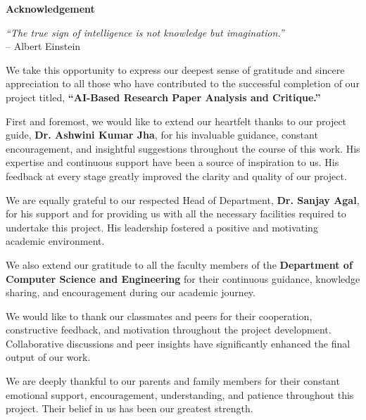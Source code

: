 \thispagestyle{empty}
\newpage
\cleardoublepage{}
{}
\begin{center}
{\Large \bf Acknowledgement}\\[10pt]
\end{center}

\begin{flushright}
\textit{“The true sign of intelligence is not knowledge but imagination.”}\\
\vspace{2mm}
– Albert Einstein
\end{flushright}

\vspace{10pt}

We take this opportunity to express our deepest sense of gratitude and sincere appreciation to all those who have contributed to the successful completion of our project titled, \textbf{“AI-Based Research Paper Analysis and Critique.”}

First and foremost, we would like to extend our heartfelt thanks to our project guide, \textbf{Dr. Ashwini Kumar Jha}, for his invaluable guidance, constant encouragement, and insightful suggestions throughout the course of this work. His expertise and continuous support have been a source of inspiration to us. His feedback at every stage greatly improved the clarity and quality of our project.

We are equally grateful to our respected Head of Department, \textbf{Dr. Sanjay Agal}, for his support and for providing us with all the necessary facilities required to undertake this project. His leadership fostered a positive and motivating academic environment.

We also extend our gratitude to all the faculty members of the \textbf{Department of Computer Science and Engineering} for their continuous guidance, knowledge sharing, and encouragement during our academic journey.

We would like to thank our classmates and peers for their cooperation, constructive feedback, and motivation throughout the project development. Collaborative discussions and peer insights have significantly enhanced the final output of our work.

We are deeply thankful to our parents and family members for their constant emotional support, encouragement, understanding, and patience throughout this project. Their belief in us has been our greatest strength.

